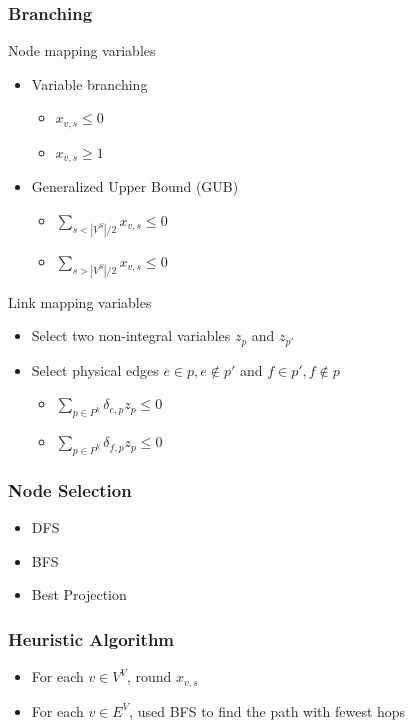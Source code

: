 \documentclass[english]{beamer}
\begin{document}
\begin{frame}
  \frametitle{Branching}
  Node mapping variables
  \begin{itemize}
    \item Variable branching
    \begin{itemize}
      \item $x_{v,s} \leq 0$
      \item $x_{v,s} \geq 1$
    \end{itemize}
    \item Generalized Upper Bound (GUB)
    \begin{itemize}
      \item $\sum\limits_{s < |V^S| / 2} x_{v,s} \leq 0$
      \item $\sum\limits_{s > |V^S| / 2} x_{v,s} \leq 0$
    \end{itemize}
  \end{itemize}
  Link mapping variables
  \begin{itemize}
    \item Select two non-integral variables $z_{p}$ and $z_{p'}$
    \item Select physical edges $e \in p, e \notin p'$ and $f \in p', f \notin p$
    \begin{itemize}
      \item $\sum\limits_{p \in P^k} \delta_{e,p} z_p \leq 0$
      \item $\sum\limits_{p \in P^k} \delta_{f,p} z_p \leq 0$
    \end{itemize}
  \end{itemize}
\end{frame}
\begin{frame}
  \frametitle{Node Selection}
\begin{itemize}
  \item DFS
  \item BFS
  \item Best Projection
\end{itemize}
\end{frame}
\begin{frame}
  \frametitle{Heuristic Algorithm}
\begin{itemize}
  \item For each $v \in V^V$, round $x_{v,s}$
  \item For each $v \in E^V$, used BFS to find the path with fewest hops
\end{itemize}
\end{frame}
\end{document}
